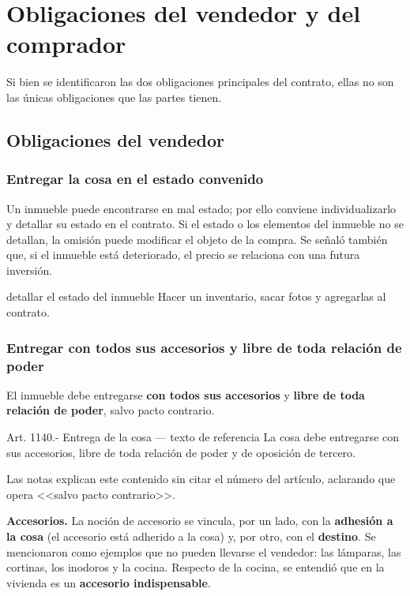 \documentclass[12pt,oneside]{book}
\begin{document}
\chapter[Obligaciones de las partes]{Obligaciones del vendedor y del comprador}

Si bien se identificaron las dos obligaciones principales del contrato, ellas no son las únicas obligaciones que las partes tienen.

\section{Obligaciones del vendedor}

\subsection{Entregar la cosa en el estado convenido}

Un inmueble puede encontrarse en mal estado; por ello conviene individualizarlo y detallar su estado en el contrato. Si el estado o los elementos del inmueble no se detallan, la omisión puede modificar el objeto de la compra. Se señaló también que, si el inmueble está deteriorado, el precio se relaciona con una futura inversión.

\begin{example}{detallar el estado del inmueble}
Hacer un inventario, sacar fotos y agregarlas al contrato.
\end{example}

\subsection{Entregar con todos sus accesorios y libre de toda relación de poder}

El inmueble debe entregarse \textbf{con todos sus accesorios} y \textbf{libre de toda relación de poder}, salvo pacto contrario.

\begin{norma}{Art. 1140.- Entrega de la cosa --- texto de referencia}
La cosa debe entregarse con sus accesorios, libre de toda relación de poder y de oposición de tercero.
\end{norma}

Las notas explican este contenido sin citar el número del artículo, aclarando que opera <<salvo pacto contrario>>.

\textbf{Accesorios.} La noción de accesorio se vincula, por un lado, con la \textbf{adhesión a la cosa} (el accesorio está adherido a la cosa) y, por otro, con el \textbf{destino}. Se mencionaron como ejemplos que no pueden llevarse el vendedor: las lámparas, las cortinas, los inodoros y la cocina. Respecto de la cocina, se entendió que en la vivienda es un \textbf{accesorio indispensable}.
\end{document}
